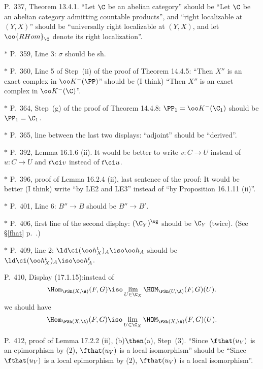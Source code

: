 \documentclass[12pt]{article}
\theoremstyle{remark}
\theoremstyle{definition}
\begin{document}
\begin{s}
P.~337, Theorem 13.4.1. ``Let $\C$ be an abelian category'' should be ``Let $\C$ be an abelian category admitting countable products'', and ``right localizable at $(Y,X)$'' should be ``universally right localizable at $(Y,X)$, and let $\oo{RHom}_\C$ denote its right localization''.
\end{s}

\nn$*$ P.~359, Line 3: $\sigma$ should be sh.

\nn$*$ P.~360, Line 5 of Step~(ii) of the proof of Theorem 14.4.5: ``Then $X''$ is an exact complex in $\oo K^-(\PP)$'' should be (I think) ``Then $X''$ is an exact complex in $\oo K^-(\C)$''.

\nn$*$ P.~364, Step~(g) of the proof of Theorem 14.4.8: $\PP_1=\oo K^-(\C_1)$ should be $\PP_1=\C_1$.

\nn$*$ P.~365, line between the last two displays: ``adjoint'' should be ``derived''.

\nn$*$ P.~392, Lemma 16.1.6 (ii). It would be better to write $v:C\to U$ instead of $u:C\to U$ and $t\ci v$ instead of $t\ci u$.

\nn$*$ P.~396, proof of Lemma 16.2.4 (ii), last sentence of the proof: It would be better (I think) write ``by LE2 and LE3'' instead of ``by Proposition 16.1.11 (ii)''.

\nn$*$ P.~401, Line 6: $B''\to B$ should be $B''\to B'$.

\nn$*$ P.~406, first line of the second display: $(\C_Y)^\wg$ should be $\C_Y$ (twice). (See \S\ref{fhat} p.~.)

\nn$*$ P.~409, line 2: $\ld\ci(\oo h_X^t)_A\iso\oo h_A$ should be $\ld\ci(\oo h_X^t)_A\iso\oo h_A^t$. 

\begin{s}
P.~410, Display (17.1.15):instead of 
$$
\Hom_{\PSh(X,\A)}(F,G)\iso\lim_{U\in\C_X}\HOM_{\PSh(U,\A)}(F,G)(U).
$$
we should have
$$
\Hom_{\PSh(X,\A)}(F,G)\iso\lim_{U\in\C_X}\HOM_{\PSh(X,\A)}(F,G)(U).
$$
\end{s}

%

\begin{s}
P.~412, proof of Lemma 17.2.2 (ii), (b)$\then$(a), Step~(3). ``Since $\fthat(u_V)$ is an epimorphism by (2), $\fthat(u_V)$ is a local isomorphism'' should be ``Since $\fthat(u_V)$ is a local epimorphism by (2), $\fthat(u_V)$ is a local isomorphism''.
\end{s}
\end{document}
